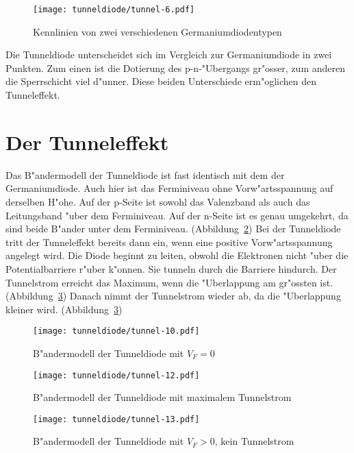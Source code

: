 \begin{refsection}
\begin{figure}	%
\centering
\texttt{[image: tunneldiode/tunnel-6.pdf]}
\caption{Kennlinien von zwei verschiedenen Germaniumdiodentypen
\label{skript:Germaniumdioden}}
\end{figure}

Die Tunneldiode unterscheidet sich im Vergleich zur Germaniumdiode in zwei Punkten. Zum einen ist die Dotierung des p-n-"Ubergangs gr"osser, zum anderen die Sperrschicht viel d"unner. Diese beiden Unterschiede erm"oglichen den Tunneleffekt.


\section{Der Tunneleffekt}
Das B"andermodell der Tunneldiode ist fast identisch mit dem der Germaniumdiode. Auch hier ist das Ferminiveau ohne Vorw"artsspannung auf derselben H"ohe. Auf der p-Seite ist sowohl das Valenzband als auch das Leitungsband "uber dem Ferminiveau. Auf der n-Seite ist es genau umgekehrt, da sind beide B"ander unter dem Ferminiveau. (Abbildung~\ref{skript:Baendermodell0})
Bei der Tunneldiode tritt der Tunneleffekt bereits dann ein, wenn eine positive Vorw"artsspannung angelegt wird. Die Diode beginnt zu leiten, obwohl die Elektronen nicht "uber die Potentialbarriere r"uber k"onnen. Sie tunneln durch die Barriere hindurch. Der Tunnelstrom erreicht das Maximum, wenn die "Uberlappung am gr"ossten ist. (Abbildung~\ref{skript:Baendermodellmax}) Danach nimmt der Tunnelstrom wieder ab, da die "Uberlappung kleiner wird. (Abbildung~\ref{skript:Baendermodellmax})

\begin{figure}	%
\centering
\texttt{[image: tunneldiode/tunnel-10.pdf]}
\caption{B"andermodell der Tunneldiode mit $V_F = 0$
\label{skript:Baendermodell0}}
\end{figure}

\begin{figure}	%
\centering
\texttt{[image: tunneldiode/tunnel-12.pdf]}
\caption{B"andermodell der Tunneldiode mit maximalem Tunnelstrom
\label{skript:Baendermodellmax}}
\end{figure}

\begin{figure}	%
\centering
\texttt{[image: tunneldiode/tunnel-13.pdf]}
\caption{B"andermodell der Tunneldiode mit $V_F > 0$, kein Tunnelstrom
\label{skript:Baendermodellmin}}
\end{figure}


\end{refsection}
